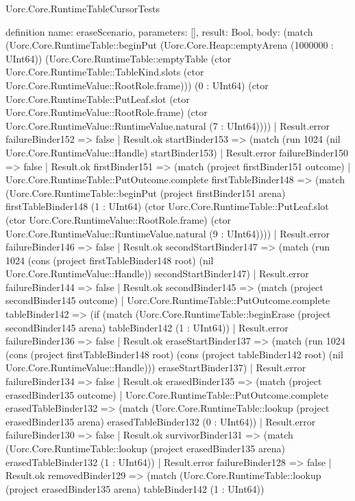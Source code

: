 \begin{lexlean}{Uorc.Core.RuntimeTableCursorTests}
\begin{semanticmodule}
definition{
  name: eraseScenario,
  parameters: [],
  result: Bool,
  body: (match (Uorc.Core.RuntimeTable::beginPut (Uorc.Core.Heap::emptyArena (1000000 : UInt64)) (Uorc.Core.RuntimeTable::emptyTable (ctor Uorc.Core.RuntimeTable::TableKind.slots (ctor Uorc.Core.RuntimeValue::RootRole.frame))) (0 : UInt64) (ctor Uorc.Core.RuntimeTable::PutLeaf.slot (ctor Uorc.Core.RuntimeValue::RootRole.frame) (ctor Uorc.Core.RuntimeValue::RuntimeValue.natural (7 : UInt64))))
    | Result.error failureBinder152 => false
    | Result.ok startBinder153 => (match (run 1024 (nil Uorc.Core.RuntimeValue::Handle) startBinder153)
      | Result.error failureBinder150 => false
      | Result.ok firstBinder151 => (match (project firstBinder151 outcome)
        | Uorc.Core.RuntimeTable::PutOutcome.complete firstTableBinder148 => (match (Uorc.Core.RuntimeTable::beginPut (project firstBinder151 arena) firstTableBinder148 (1 : UInt64) (ctor Uorc.Core.RuntimeTable::PutLeaf.slot (ctor Uorc.Core.RuntimeValue::RootRole.frame) (ctor Uorc.Core.RuntimeValue::RuntimeValue.natural (9 : UInt64))))
          | Result.error failureBinder146 => false
          | Result.ok secondStartBinder147 => (match (run 1024 (cons (project firstTableBinder148 root) (nil Uorc.Core.RuntimeValue::Handle)) secondStartBinder147)
            | Result.error failureBinder144 => false
            | Result.ok secondBinder145 => (match (project secondBinder145 outcome)
              | Uorc.Core.RuntimeTable::PutOutcome.complete tableBinder142 => (if (match (Uorc.Core.RuntimeTable::beginErase (project secondBinder145 arena) tableBinder142 (1 : UInt64))
                | Result.error failureBinder136 => false
                | Result.ok eraseStartBinder137 => (match (run 1024 (cons (project firstTableBinder148 root) (cons (project tableBinder142 root) (nil Uorc.Core.RuntimeValue::Handle))) eraseStartBinder137)
                  | Result.error failureBinder134 => false
                  | Result.ok erasedBinder135 => (match (project erasedBinder135 outcome)
                    | Uorc.Core.RuntimeTable::PutOutcome.complete erasedTableBinder132 => (match (Uorc.Core.RuntimeTable::lookup (project erasedBinder135 arena) erasedTableBinder132 (0 : UInt64))
                      | Result.error failureBinder130 => false
                      | Result.ok survivorBinder131 => (match (Uorc.Core.RuntimeTable::lookup (project erasedBinder135 arena) erasedTableBinder132 (1 : UInt64))
                        | Result.error failureBinder128 => false
                        | Result.ok removedBinder129 => (match (Uorc.Core.RuntimeTable::lookup (project erasedBinder135 arena) tableBinder142 (1 : UInt64))
}
\end{semanticmodule}
\end{lexlean}
